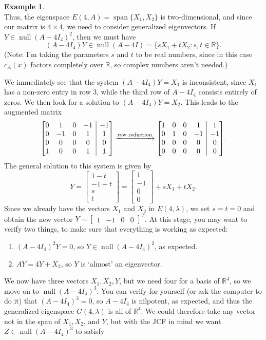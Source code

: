 \documentclass[12pt,letterpaper]{article}
\makeatletter
\theoremstyle{definition}
\newtheorem{example}{Example}
\newenvironment{amatrix}[1]{%
  \left[\begin{array}{@{}*{#1}{c}|c@{}}
}{%
  \end{array}\right]
}
\newcommand{\R}{\mathbb{R}}
\DeclareMathOperator{\spn}{span}
\DeclareMathOperator{\nul}{null}
\makeatother
\begin{document}
\begin{example}
\[\]
Thus, the eigenspace $E(4,A)=\spn\{X_1,X_2\}$ is two-dimensional, and since our matrix is $4\times 4$, we need to consider generalized eigenvectors. If $Y\in \nul (A-4I_4)^2$, then we must have
\[
 (A-4I_4)Y \in\nul (A-4I) = \{sX_1+tX_2 : s,t\in\R\}.
\]
(Note: I'm taking the parameters $s$ and $t$ to be real numbers, since in this case $c_A(x)$ factors completely over $\R$, so complex numbers aren't needed.)

We immediately see that the system $(A-4I_4)Y=X_1$ is inconsistent, since $X_1$ has a non-zero entry in row 3, while the third row of $A-4I_4$ consists entirely of zeros. We then look for a solution to $(A-4I_4)Y=X_2$. This leads to the augmented matrix
\[
 \begin{amatrix}{4}
  0&1&0&-1&-1\\0&-1&0&1&1\\0&0&0&0&0\\1&0&0&1&1
 \end{amatrix}\xrightarrow[]{\text{row reduction}}
 \begin{amatrix}{4}
  1&0&0&1&1\\0&1&0&-1&-1\\0&0&0&0&0\\0&0&0&0&0
 \end{amatrix}.
\]
The general solution to this system is given by
\[
 Y = \begin{bmatrix}1-t\\-1+t\\s\\t\end{bmatrix} = \begin{bmatrix}1\\-1\\0\\0\end{bmatrix}+sX_1+tX_2.
\]
Since we already have the vectors $X_1$ and $X_2$ in $E(4,\lambda)$, we set $s=t=0$ and obtain the new vector $Y=\begin{bmatrix}1&-1&0&0\end{bmatrix}^T$. At this stage, you may want to verify two things, to make sure that everything is working as expected:
\begin{enumerate}
 \item $(A-4I_4)^2Y=0$, so $Y\in \nul (A-4I_4)^2$, as expected.
 \item $AY = 4Y+X_2$, so $Y$ is `almost' an eigenvector.
\end{enumerate}
We now have three vectors $X_1,X_2,Y$, but we need four for a basis of $\R^4$, so we move on to $\nul (A-4I_4)^3$. You can verify for yourself (or ask the computer to do it) that $(A-4I_4)^3=0$, so $A-4I_4$ is nilpotent, as expected, and thus the generalized eigenspace $G(4,\lambda)$ is all of $\R^4$. We could therefore take any vector not in the span of $X_1, X_2$, and $Y$, but with the JCF in mind we want $Z\in\nul(A-4I_4)^3$ to satisfy

\end{example}
\end{document}

